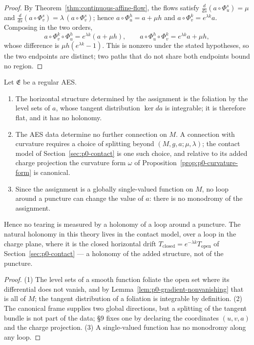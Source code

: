 \begin{proof}
By Theorem~\ref{thm:continuous-affine-flow}, the flows satisfy
$\frac{d}{ds}(a\circ\Phi_u^s)=\mu$ and
$\frac{d}{ds}(a\circ\Phi_v^s)=\lambda\,(a\circ\Phi_v^s)$; hence
$a\circ\Phi_u^h=a+\mu h$ and $a\circ\Phi_v^k=e^{\lambda k}a$.  Composing in the
two orders,
\[
  a\circ\Phi_v^k\circ\Phi_u^h=e^{\lambda k}(a+\mu h),
  \qquad
  a\circ\Phi_u^h\circ\Phi_v^k=e^{\lambda k}a+\mu h ,
\]
whose difference is $\mu h(e^{\lambda k}-1)$.  This is nonzero under the stated
hypotheses, so the two endpoints are distinct; two paths that do not share both
endpoints bound no region.
\end{proof}

\begin{proposition}
\label{prop:p0-no-puncture-holonomy}
Let $\mathfrak E$ be a regular AES.
\begin{enumerate}
  \item The horizontal structure determined by the assignment is the foliation
  by the level sets of $a$, whose tangent distribution $\ker da$ is integrable;
  it is therefore flat, and it has no holonomy.
  \item The AES data determine no further connection on $M$.  A connection with
  curvature requires a choice of splitting beyond $(M,g,a;\mu,\lambda)$; the
  contact model of Section~\ref{sec:p0-contact} is one such choice, and relative
  to its added charge projection the curvature form $\omega$ of
  Proposition~\ref{prop:p0-curvature-form} is canonical.
  \item Since the assignment is a globally single-valued function on $M$, no loop
  around a puncture can change the value of $a$: there is no monodromy of the
  assignment.
\end{enumerate}
Hence no tearing is measured by a holonomy of a loop around a puncture.  The
natural holonomy in this theory lives in the contact model, over a loop in the
charge plane, where it is the closed horizontal drift
$T_{\mathrm{closed}}=e^{-\lambda k}T_{\mathrm{open}}$ of
Section~\ref{sec:p0-contact} --- a holonomy of the added structure, not of the
puncture.
\end{proposition}

\begin{proof}
(1) The level sets of a smooth function foliate the open set where its
differential does not vanish, and by
Lemma~\ref{lem:p0-gradient-nonvanishing} that is all of $M$; the tangent
distribution of a foliation is integrable by definition.  (2) The canonical
frame supplies two global directions, but a splitting of the tangent bundle is
not part of the data; §9 fixes one by declaring the coordinates $(u,v,a)$ and the
charge projection.  (3) A single-valued function has no monodromy along any loop.
\end{proof}


